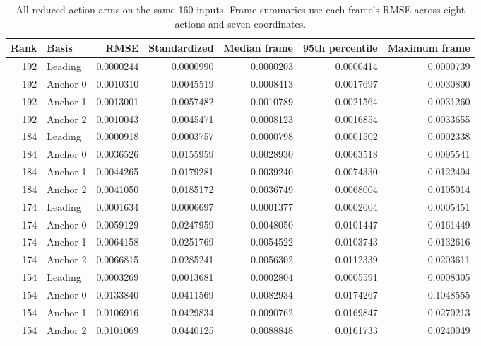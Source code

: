 \documentclass{article}
\begin{document}
\begin{table}[ht]
\centering\small\setlength{\tabcolsep}{5pt}
\begin{tabular}{@{}rlrrrrr@{}}
\toprule
Rank & Basis & RMSE & Standardized & Median frame & 95th percentile & Maximum frame\\
\midrule
192 & Leading & 0.0000244 & 0.0000990 & 0.0000203 & 0.0000414 & 0.0000739\\
192 & Anchor 0 & 0.0010310 & 0.0045519 & 0.0008413 & 0.0017697 & 0.0030800\\
192 & Anchor 1 & 0.0013001 & 0.0057482 & 0.0010789 & 0.0021564 & 0.0031260\\
192 & Anchor 2 & 0.0010043 & 0.0045471 & 0.0008123 & 0.0016854 & 0.0033655\\
184 & Leading & 0.0000918 & 0.0003757 & 0.0000798 & 0.0001502 & 0.0002338\\
184 & Anchor 0 & 0.0036526 & 0.0155959 & 0.0028930 & 0.0063518 & 0.0095541\\
184 & Anchor 1 & 0.0044265 & 0.0179281 & 0.0039240 & 0.0074330 & 0.0122404\\
184 & Anchor 2 & 0.0041050 & 0.0185172 & 0.0036749 & 0.0068004 & 0.0105014\\
174 & Leading & 0.0001634 & 0.0006697 & 0.0001377 & 0.0002604 & 0.0005451\\
174 & Anchor 0 & 0.0059129 & 0.0247959 & 0.0048050 & 0.0101447 & 0.0161449\\
174 & Anchor 1 & 0.0064158 & 0.0251769 & 0.0054522 & 0.0103743 & 0.0132616\\
174 & Anchor 2 & 0.0066815 & 0.0285241 & 0.0056302 & 0.0112339 & 0.0203611\\
154 & Leading & 0.0003269 & 0.0013681 & 0.0002804 & 0.0005591 & 0.0008305\\
154 & Anchor 0 & 0.0133840 & 0.0411569 & 0.0082934 & 0.0174267 & 0.1048555\\
154 & Anchor 1 & 0.0106916 & 0.0429834 & 0.0090762 & 0.0169847 & 0.0270213\\
154 & Anchor 2 & 0.0101069 & 0.0440125 & 0.0088848 & 0.0161733 & 0.0240049\\
\bottomrule
\end{tabular}
\caption{All reduced action arms on the same 160 inputs. Frame summaries use each frame's RMSE across eight actions and seven coordinates.}
\label{tab.actiontails}
\end{table}
\end{document}
